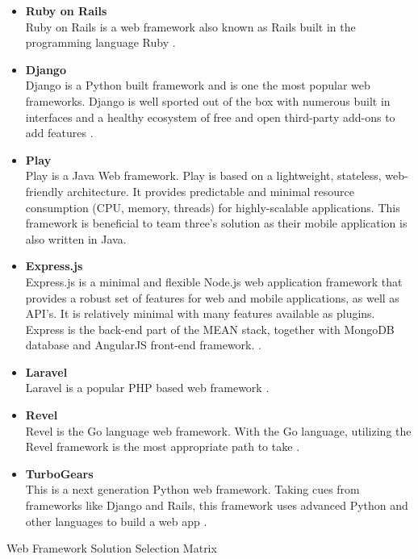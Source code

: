 \documentclass[Letter,11pt]{article}
\begin{document}
		\begin{itemize}
			\item \textbf{Ruby on Rails} \\
			Ruby on Rails is a web framework also known as Rails built in the programming language Ruby \cite{rubyonrails}.  
			\item \textbf{Django} \\
			Django is a Python built framework and is one the most popular web frameworks. Django is well sported out of the box with numerous built in interfaces and a healthy ecosystem of free and open third-party add-ons to add features \cite{django}.
			\item \textbf{Play} \\

			Play is a Java Web framework. Play is based on a lightweight, stateless, web-friendly architecture. It provides predictable and minimal resource consumption (CPU, memory, threads) for highly-scalable applications. This framework is beneficial to team three's solution as their mobile application is also written in Java\cite{play}.
			\item  \textbf{Express.js}\\
			Express.js is a minimal and flexible Node.js web application framework that provides a robust set of features for web and mobile applications, as well as API's. It is relatively minimal with many features available as plugins. Express is the back-end part of the MEAN stack, together with MongoDB database and AngularJS front-end framework. \cite{express}.
			\item \textbf{Laravel} \\
			Laravel is a popular PHP based web framework \cite{laravel}. 
			\item \textbf{Revel} \\
			Revel is the Go language web framework. With the Go language, utilizing the Revel framework is the most appropriate path to take \cite{revel}.
			\item \textbf{TurboGears}\\

			This is a next generation Python web framework. Taking cues from frameworks like Django and Rails, this framework uses advanced Python and other languages to build a web app \cite{turbogears}.
		\end{itemize}
		
		
	
		\begin{table}[h]
			\centering
			
			\caption{\label{WebMatrix} Web Framework Solution Selection Matrix}
		\end{table}
	
\end{document}
